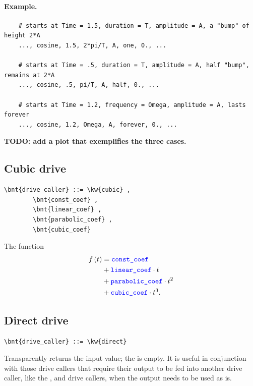 \paragraph{Example.}
\begin{verbatim}
    # starts at Time = 1.5, duration = T, amplitude = A, a "bump" of height 2*A
    ..., cosine, 1.5, 2*pi/T, A, one, 0., ...

    # starts at Time = .5, duration = T, amplitude = A, half "bump", remains at 2*A
    ..., cosine, .5, pi/T, A, half, 0., ...

    # starts at Time = 1.2, frequency = Omega, amplitude = A, lasts forever
    ..., cosine, 1.2, Omega, A, forever, 0., ...
\end{verbatim}

\textbf{TODO: add a plot that exemplifies the three cases.}

\subsection{Cubic drive}
\begin{Verbatim}[commandchars=\\\{\}]
    \bnt{drive_caller} ::= \kw{cubic} ,
        \bnt{const_coef} , 
        \bnt{linear_coef} ,
        \bnt{parabolic_coef} , 
        \bnt{cubic_coef}
\end{Verbatim}
The function
\begin{align}
	f\left( t \right) &= \textcolor{blue}{\texttt{const\_coef}} \nonumber \\
		&+ \textcolor{blue}{\texttt{linear\_coef}} \cdot t \nonumber \\
		&+ \textcolor{blue}{\texttt{parabolic\_coef}} \cdot t^2 \nonumber \\
		&+ \textcolor{blue}{\texttt{cubic\_coef}} \cdot t^3
	.
\end{align}

\subsection{Direct drive}
\begin{Verbatim}[commandchars=\\\{\}]
    \bnt{drive_caller} ::= \kw{direct}
\end{Verbatim}
Transparently returns the input value; the  is empty.
It is useful in conjunction with those drive callers
that require their output to be fed into another drive caller,
like the ,  and 
drive callers, when the output needs to be used as is.

